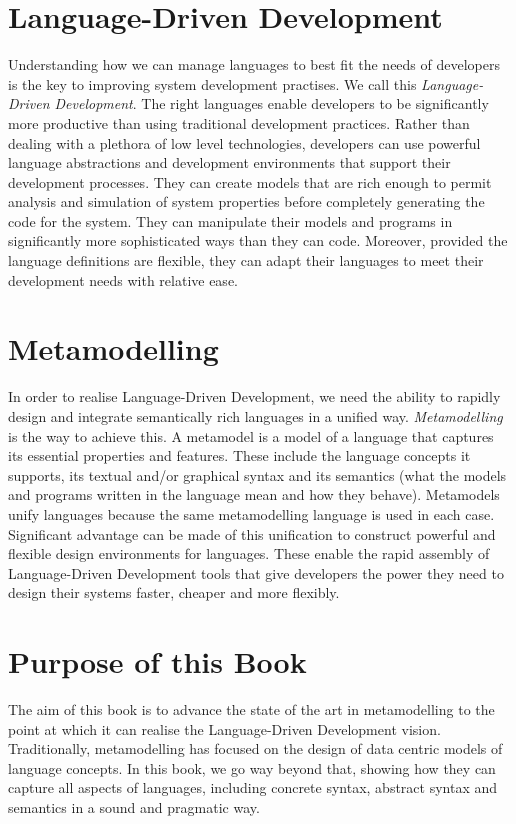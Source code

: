 \section*{Language-Driven Development}

Understanding how we can manage languages to best fit the needs of
developers is the key to improving system development practises.
We call this {\em Language-Driven Development}. The right
languages enable developers to be significantly more productive
than using traditional development practices. Rather than dealing
with a plethora of low level technologies, developers can use
powerful language abstractions and development environments that
support their development processes. They can create models that
are rich enough to permit analysis and simulation of system
properties before completely generating the code for the system.
They can manipulate their models and programs in significantly
more sophisticated ways than they can code. Moreover, provided the
language definitions are flexible, they can adapt their languages
to meet their development needs with relative ease.

\section*{Metamodelling}

In order to realise Language-Driven Development, we need the
ability to rapidly design and integrate semantically rich
languages in a unified way. {\em Metamodelling} is the way to
achieve this. A metamodel is a model of a language that captures
its essential properties and features. These include the language
concepts it supports, its textual and/or graphical syntax and its
semantics (what the models and programs written in the language
mean and how they behave). Metamodels unify languages because the
same metamodelling language is used in each case. Significant
advantage can be made of this unification to construct powerful
and flexible design environments for languages. These enable the
rapid assembly of Language-Driven Development tools that give
developers the power they need to design their systems faster,
cheaper and more flexibly.

\section*{Purpose of this Book}

The aim of this book is to advance the state of the art in
metamodelling to the point at which it can realise the
Language-Driven Development vision. Traditionally, metamodelling
has focused on the design of data centric models of language
concepts. In this book, we go way beyond that, showing how they
can capture all aspects of languages, including concrete syntax,
abstract syntax and semantics in a sound and pragmatic way.

